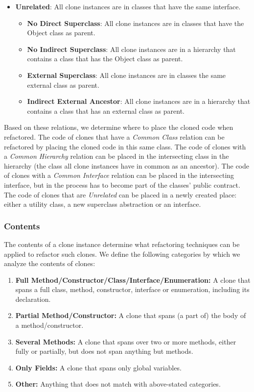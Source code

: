 \documentclass[sigconf,review, table]{acmart}
\begin{document}
\begin{itemize}
\begin{itemize}
    \end{itemize}
    \item \textbf{Unrelated}: All clone instances are in classes that have the same interface.
    \begin{itemize}
        \item \textbf{No Direct Superclass}: All clone instances are in classes that have the Object class as parent.
        \item \textbf{No Indirect Superclass}: All clone instances are in a hierarchy that contains a class that has the Object class as parent.
        \item \textbf{External Superclass}: All clone instances are in classes the same external class as parent.
        \item \textbf{Indirect External Ancestor}: All clone instances are in a hierarchy that contains a class that has an external class as parent.
    \end{itemize}
\end{itemize}

Based on these relations, we determine where to place the cloned code when refactored. The code of clones that have a \textit{Common Class} relation can be refactored by placing the cloned code in this same class. The code of clones with a \textit{Common Hierarchy} relation can be placed in the intersecting class in the hierarchy (the class all clone instances have in common as an ancestor). The code of clones with a \textit{Common Interface} relation can be placed in the intersecting interface, but in the process has to become part of the classes' public contract. The code of clones that are \textit{Unrelated} can be placed in a newly created place: either a utility class, a new superclass abstraction or an interface.

\subsubsection{Contents}\label{sec:contents}
The contents of a clone instance determine what refactoring techniques can be applied to refactor such clones. We define the following categories by which we analyze the contents of clones:
\begin{enumerate}
  \item \textbf{Full Method/Constructor/Class/Interface/Enumeration:} A clone that spans a full class, method, constructor, interface or enumeration, including its declaration.
  \item \textbf{Partial Method/Constructor:} A clone that spans (a part of) the body of a method/constructor.
  \item \textbf{Several Methods:} A clone that spans over two or more methods, either fully or partially, but does not span anything but methods.
  \item \textbf{Only Fields:} A clone that spans only global variables.
  \item \textbf{Other:} Anything that does not match with above-stated categories.
\end{enumerate}
\end{document}
